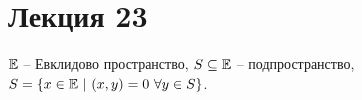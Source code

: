 \section*{Лекция 23}
%

$\mathbb{E}$ -- Евклидово пространство, $S \subseteq \mathbb{E}$ -- подпространство, $S = \{x \in \mathbb{E}\ |\ (x, y) = 0\ \forall y \in S\}$.
